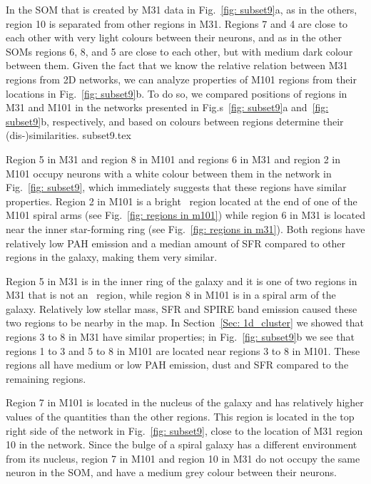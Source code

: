     In the SOM that is created by M31 data in Fig.~\ref{fig: subset9}a, as in the others, region 10 is separated from other regions in M31.
    Regions 7 and 4 are close to each other with very light colours between their neurons, and as in the other SOMs regions 6, 8, and 5 are close to each other, but with medium dark colour between them.
    Given the fact that we know the relative relation between M31 regions from 2D networks, we can analyze properties of M101 regions from their locations in Fig.~\ref{fig: subset9}b.
    To do so, we compared positions of regions in M31 and M101 in the networks presented in Fig.s~\ref{fig: subset9}a and~\ref{fig: subset9}b, respectively, and based on colours between regions determine their (dis-)similarities.
    {subset9.tex}
    
    Region 5 in M31 and region 8 in M101 and regions 6 in M31 and region 2 in M101 occupy neurons with a white colour between them in the network in Fig.~\ref{fig: subset9}, which immediately suggests that these regions have similar properties. 
    Region 2 in M101 is a bright \hii~region located at the end of one of the M101 spiral arms (see Fig.~\ref{fig: regions in m101}) while
    region 6 in M31 is located near the inner star-forming ring (see Fig.~\ref{fig: regions in m31}).
    Both regions have relatively low PAH emission and a median amount of SFR compared to other regions in the galaxy, making them very similar.
    
    Region 5 in M31 is in the inner ring of the galaxy and it is one of two regions in M31 that is not an  \hii~region, while
    region 8 in M101 is in a spiral arm of the galaxy.
    Relatively low stellar mass, SFR and SPIRE band emission caused these two regions to be nearby in the map.
    In Section~\ref{Sec: 1d_cluster} we showed that regions 3 to 8 in M31 have similar properties; in Fig.~\ref{fig: subset9}b we see that regions 1 to 3 and 5 to 8 in M101 are located near regions 3 to 8 in M101. 
    These regions all have medium or low PAH emission, dust and SFR compared to the remaining regions.
    
    Region 7 in M101 is located in the nucleus of the galaxy and has relatively higher values of the quantities than the other regions.
    This region is located in the top right side of the network in Fig.~\ref{fig: subset9}, close to the location of M31 region 10 in the network.
    Since the bulge of a spiral galaxy has a different environment from its nucleus, region 7 in M101 and region 10 in M31 do not occupy the same neuron in the SOM, and have a medium grey colour between their neurons.

